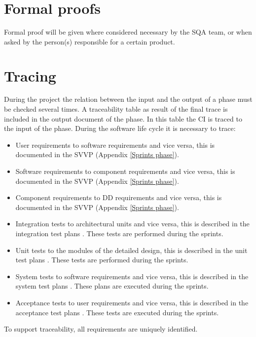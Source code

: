 \section{Formal proofs}
Formal proof will be given where considered necessary by the SQA team, or when asked by the person(s) responsible for a certain product.

\section{Tracing} \label{tracing}
During the project the relation between the input and the output of a phase must be checked several times. A traceability table as result of the final trace is included in the output document of the phase. In this table the CI is traced to the input of the phase. During the software life cycle it is necessary to trace:

\begin{itemize}
\item User requirements to software requirements and vice versa, this is documented in the SVVP (Appendix \ref{Sprints phase}).
\item Software requirements to component requirements and vice versa, this is documented in the SVVP (Appendix \ref{Sprints phase}).
\item Component requirements to DD requirements and vice versa, this is documented in the SVVP (Appendix \ref{Sprints phase}).
\item Integration tests to architectural units and vice versa, this is described in the integration test plans \cite{itp}. These tests are performed during the sprints.
\item Unit tests to the modules of the detailed design, this is described in the unit test plans \cite{utp}. These tests are performed during the sprints.
\item System tests to software requirements and vice versa, this is described in the system test plans \cite{stp}. These plans \cite{spmp} are executed during the sprints.
\item Acceptance tests to user requirements and vice versa, this is described in the acceptance test plans \cite{atp}. These tests are executed during the sprints.
\end{itemize}
To support traceability, all requirements are uniquely identified.
